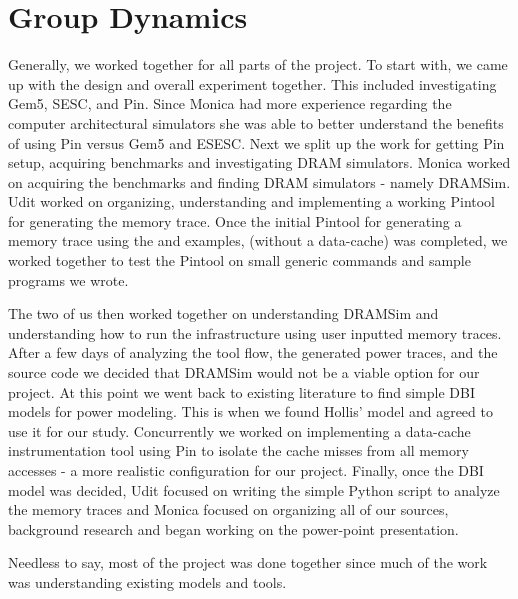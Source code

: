 \section{Group Dynamics}
\label{sec-group-dynamics}

Generally, we worked together for all parts of the project. To start with, we
came up with the design and overall experiment together. This included
investigating Gem5, SESC, and Pin. Since Monica had more experience regarding
the computer architectural simulators she was able to better understand the
benefits of using Pin versus Gem5 and ESESC. Next we split up the work for
getting Pin setup, acquiring benchmarks and investigating DRAM simulators.
Monica worked on acquiring the benchmarks and finding DRAM simulators - namely
DRAMSim. Udit worked on organizing, understanding and implementing a working
Pintool for generating the memory trace. Once the initial Pintool for
generating a memory trace using the  and  examples,
(without a data-cache) was completed, we worked together to test the Pintool on
small generic  commands and sample programs we wrote.

The two of us then worked together on understanding DRAMSim and understanding
how to run the infrastructure using user inputted memory traces. After a few
days of analyzing the tool flow, the generated power traces, and the source
code we decided that DRAMSim would not be a viable option for our
project. At this point we went back to existing literature to find simple DBI
models for power modeling. This is when we found Hollis' model \cite{hollis}
and agreed to use it for our study. Concurrently we worked on implementing a
data-cache instrumentation tool using Pin to isolate the cache misses from all
memory accesses - a more realistic configuration for our project. Finally, once
the DBI model was decided, Udit focused on writing the simple Python script to
analyze the memory traces and Monica focused on organizing all of our sources,
background research and began working on the power-point presentation.

Needless to say, most of the project was done together since much of the work
was understanding existing models and tools.
